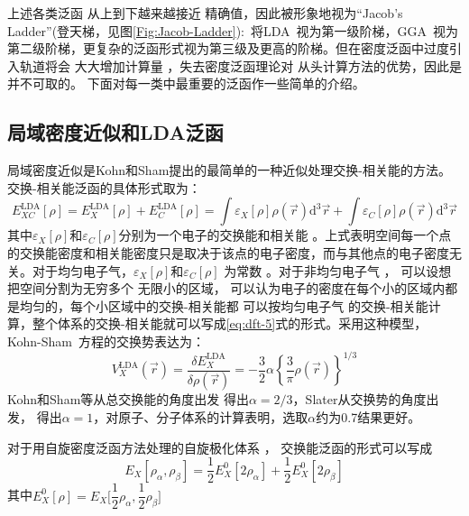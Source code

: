 上述{各类}泛函%
从上到下越来越接近%
精确值，因此被形象地视为``Jacob's Ladder''(登天梯，见图\ref{Fig:Jacob-Ladder}):~将\textrm{LDA~}视为第一级阶梯，\textrm{GGA~}视为第二级阶梯，更复杂的泛函形式视为第三级及更高的阶梯。\cite{PRL91-146401_2003}但在密度泛函中过度引入轨道将会%
{大大增加}计算量%
，失去密度泛函理论对%
从头计算方法的优势，因此是{并}不可取的。
下面对每一类中最重要的泛函作一些简单的介绍。

\subsection{局域密度近似和LDA泛函}
局域密度近似是Kohn和Sham提出的最简单的一种近似处理交换-相关能的方法。交换-相关能{泛函}的具体形式取为：
\begin{equation}
  \label{eq:dft-5}
  E_{XC}^{\mathrm{LDA}}[\rho]=E_X^{\mathrm{LDA}}[\rho]+E_C^{\mathrm{LDA}}[\rho]=\int\varepsilon_X[\rho]\rho(\vec{r}) \textrm{d}^3\vec{r}+\int\varepsilon_C[\rho]\rho(\vec{r}) \textrm{d}^3\vec{r}
\end{equation}
其中$\varepsilon_X[\rho]$和$\varepsilon_C[\rho]$分别为{一个电子的}交换能和相关能%
。上式表明空间每一个点的交换能密度和相关能密度只是取决于该点的电子密度，而与其他点的电子密度无关。对{于均匀电子气，}$\varepsilon_X[\rho]$和$\varepsilon_C[\rho]$%
{为常数%
。}对于非均匀电子气%
，%
{可以设想}把空间分割为无穷多个%
{无限}小的区域，%
{可以认为}电子的密度在每个小的区域内都是均匀的，每个小区域中的交换-相关能都%
{可以按}均匀电子气%
的交换-相关能{计算}，整个体系的交换-相关能就可以写成\eqref{eq:dft-5}式的形式。{采用}这种模型{，}%
\textrm{Kohn-Sham~}方程的交换势表达为：
\begin{equation} \label{eq:dft-6}
	V_X^{\mathrm{LDA}}(\vec{r}) =\dfrac {\delta E_X^{\mathrm{LDA}}}{\delta\rho(\vec{r}) }=-\dfrac 32\alpha\left\{\dfrac3\pi\rho(\vec{r}) \right\}^{1/3}
\end{equation}
Kohn和Sham等从总交换能的角度出发%
{得}出$\alpha=2/3$\cite{PR140-A1133_1965}，Slater从交换势的角度出发，%
{得}出$\alpha=1$\cite{PR81-385_1951}，对原子、分子体系的计算表明，选取$\alpha$约为0.7\cite{AQC6-1_1972,Slater-4_1974}结果更好。

对于用自旋密度泛函方法处理的自旋极化体系%
，%
交换能{泛函的}形式可以写成\cite{PRA20-397_1979}
\begin{equation} \label{eq:dft-7}
E_X[\rho_{\alpha},\rho_{\beta}]=\frac12E_X^{0}[2\rho_{\alpha}]+\frac12E_X^{0}[2\rho_{\beta}]
\end{equation}
其中$E_X^{0}[\rho]=E_X\bigl[\dfrac 12\rho_{\alpha},\dfrac 12\rho_{\beta}\bigr]$

